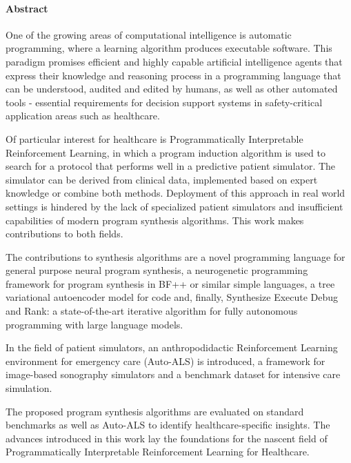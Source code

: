 \paragraph{Abstract}

One of the growing areas of computational intelligence is automatic programming, where a learning algorithm produces executable software. This paradigm promises efficient and highly capable artificial intelligence agents that express their knowledge and reasoning process in a programming language that can be understood, audited and edited by humans, as well as other automated tools - essential requirements for decision support systems in safety-critical application areas such as healthcare.

Of particular interest for healthcare is Programmatically Interpretable Reinforcement Learning, in which a program induction algorithm is used to search for a protocol that performs well in a predictive patient simulator.
The simulator can be derived from clinical data, implemented based on expert knowledge or combine both methods.
Deployment of this approach in real world settings is hindered by the lack of specialized patient simulators and insufficient capabilities of modern program synthesis algorithms.
This work makes contributions to both fields.

The contributions to synthesis algorithms are a novel programming language for general purpose neural program synthesis, a neurogenetic programming framework for program synthesis in BF++ or similar simple languages, a tree variational autoencoder model for code and, finally, Synthesize Execute Debug and Rank: a state-of-the-art iterative algorithm for fully autonomous programming with large language models.

In the field of patient simulators, an anthropodidactic Reinforcement Learning environment for emergency care (Auto-ALS) is introduced, a framework for image-based sonography simulators and a benchmark dataset for intensive care simulation. 

The proposed program synthesis algorithms are evaluated on standard benchmarks as well as Auto-ALS to identify healthcare-specific insights.
The advances introduced in this work lay the foundations for the nascent field of Programmatically Interpretable Reinforcement Learning for Healthcare.